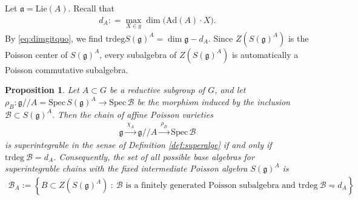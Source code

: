 \documentclass[11pt,reqno]{amsart}
\newtheorem*{theorem A}{Main Theorem A}
\newtheorem*{theorem B}{Main Theorem B}
\newtheorem*{theorem C}{Main Theorem C}
\newtheorem*{theorem D}{Main Theorem D}
\newtheorem{proposition}[theorem]{Proposition}
\theoremstyle{definition}
\theoremstyle{plain}
\theoremstyle{conclusion}
\begin{document}
Let $\mathfrak{a} = \mathrm{Lie} (A)$. Recall that \begin{align*}
    d_A: = \max_{X\in g}\dim\bigl(\mathrm{Ad}(A)\cdot X\bigr).
\end{align*} By \eqref{eq:dimgitquo}, we find $ \mathrm{trdeg} S(\mathfrak{g})^A = \dim \mathfrak{g} - d_A$. Since $Z(S(\mathfrak{g})^A)$ is the Poisson center of $S(\mathfrak{g})^A$, every subalgebra of $Z(S(\mathfrak{g})^A)$ is automatically a Poisson commutative subalgebra. 

\begin{proposition}
\label{prop:superinchainA}
    Let $A \subset G$ be a reductive subgroup of $G$, and let  $  \rho_B: \mathfrak{g}//A = \mathrm{Spec} \, S(\mathfrak{g})^A \longrightarrow \mathrm{Spec} \, \mathcal{B}$  be the morphism induced by the inclusion $\mathcal{B} \subset S(\mathfrak{g})^A$. Then the chain of affine Poisson varieties \begin{align}
        \mathfrak{g} \xrightarrow{ \ \chi_A \ } \mathfrak{g}//A \xrightarrow{ \ \rho_B \ } \mathrm{Spec }\, \mathcal{B} \label{eq:superintechaingA}
    \end{align} is superintegrable in the sense of Definition \ref{def:superalge} if and only if $\mathrm{trdeg} \ \mathcal{B}  = d_A$. Consequently, the set of all possible base algebras for superintegrable chains with the fixed intermediate Poisson algebra $S(\mathfrak{g})^A$ is \begin{align*}
        \mathcal{B}_A:=\left\{B\subset Z \left(S(\mathfrak{g})^A\right)\ : \ \mathcal{B} \text{ is a finitely generated Poisson subalgebra and } \mathrm{trdeg} \ \mathcal{B} =d_A\right\}.
    \end{align*}
\end{proposition}
\end{document}
